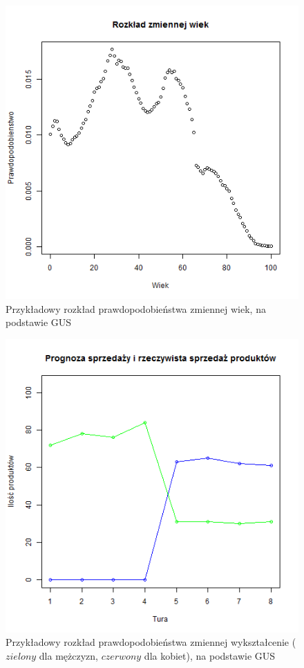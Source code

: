 \documentclass[polish, twoside, 12pt, a4paper]{article}
\theoremstyle{definition}
\theoremstyle{plain}
\theoremstyle{remark}
\begin{document}
\begin{figure}
  \centering
\includegraphics[width=\linewidth]{pictures/wiek.png}
  \caption{Przykładowy rozkład prawdopodobieństwa zmiennej wiek, na podstawie GUS}
  \label{fig:wiek}
\end{figure}

\begin{figure}
  \centering
\includegraphics[width=\linewidth]{pictures/wyksztalcenie.png}
  \caption{Przykładowy rozkład prawdopodobieństwa zmiennej wykształcenie ($zielony$ dla mężczyzn, $czerwony$ dla kobiet), na podstawie GUS}
  \label{fig:wyksztalcenie}
\end{figure}
\end{document}
